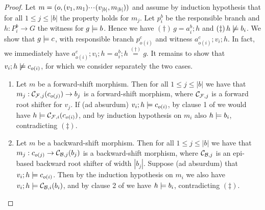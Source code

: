 \begin{proof}
Let $m = (o,(v_1,m_1){\cdotp\mkern-2mu\cdotp\mkern-2mu\cdotp\mkern1mu} (v_{|b|},m_{|b|}))$ and assume by induction hypothesis that for all $1\leq j\leq |b|$ the property holds for $m_j$. Let $p^b_i$ be the responsible branch and $h: P^b_i \to G$ the witness for $g\models b$. 
Hence we have $(\dagger)\, g=a^b_i;h$ and $(\ddagger)\, h \not\models b_i$.  
We show that $g \models c$, with responsible branch $p^c_{o(i)}$ and witness $a^c_{o(i)}; v_i ;h$. In fact, we immediately have  $a^c_{o(i)}; v_i ;h = a^b_i ; h \stackrel{(\dagger)}{=} g$. It remains to show that $v_i ;h \not\models c_{o(i)}$, for which we consider separately the two cases.
\begin{enumerate}
\item Let $m$ be a forward-shift morphism. Then for all $1\leq j\leq |b|$ we have that   $m_j:\mathcal{C}_{\mathcal{F},j}(c_{o(j)}) \to b_j$ is a forward-shift morphism, where $\mathcal{C}_{\mathcal{F},j}$ is a forward root shifter for $v_j$. If (ad absurdum) $v_i ;h \models c_{o(i)}$, by clause 1 of  we would have $h \models \mathcal{C}_{\mathcal{F},i}(c_{o(i)})$, and by induction hypothesis on $m_i$ also $h \models b_i$, contradicting $(\ddagger)$.

\item Let $m$ be a backward-shift morphism. Then for all $1\leq j\leq |b|$ we have that  $m_j:c_{o(j)}\to \mathcal{C}_{\mathcal{B},j}(b_j)$ is a backward-shift morphism, where $\mathcal{C}_{\mathcal{B},j}$ is an epi-based backward root shifter of width $|b_j|$.
Suppose (ad absurdum) that $v_i ;h \models c_{o(i)}$. Then by the induction hypothesis on $m_i$ we also have $v_i ;h \models \mathcal{C}_{\mathcal{B},i}(b_i)$, and by clause 2 of   we  have $h \models b_i$, contradicting $(\ddagger)$. 



\end{enumerate}
\end{proof}
%

